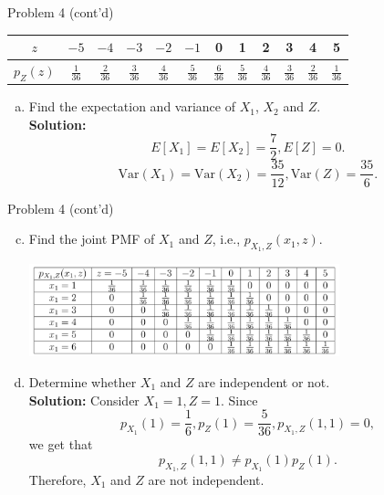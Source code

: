 \documentclass{beamer}
\begin{document}
\begin{frame}{Problem 4 (cont'd)}
\begin{center}
\begin{tabular}{|c|c|c|c|c|c|c|c|c|c|c|c|}
  \hline
  $z$ & $-5$ & $-4$ & $-3$ & $-2$ & $-1$ & 0 & 1 & 2 & 3 & 4 & 5 \\
  \hline
  $p_{Z}(z)$ & $\frac{1}{36}$ & $\frac{2}{36}$ & $\frac{3}{36}$ & $\frac{4}{36}$ & $\frac{5}{36}$
  & $\frac{6}{36}$ & $\frac{5}{36}$ & $\frac{4}{36}$ & $\frac{3}{36}$ & $\frac{2}{36}$ & $\frac{1}{36}$\\
  \hline
\end{tabular}
\end{center}
    \begin{enumerate}[(b)]
        \item Find the expectation and variance of $X_1$, $X_2$ and $Z$. \\
            {\bf Solution:}
            \[E[X_1]=E[X_2]=\frac{7}{2}, E[Z]=0.\]
            \[\text{Var}(X_1)=\text{Var}(X_2)= \frac{35}{12}, \text{Var}(Z)= \frac{35}{6}.\]
    \end{enumerate}
\end{frame}
\begin{frame}{Problem 4 (cont'd)}
    \begin{enumerate}[(a)]
    \setcounter{enumi}{2}
        \item Find the joint PMF of $X_1$ and $Z$, i.e., $p_{X_1,Z}(x_1,z)$. \\
        \begin{center}
            \includegraphics[width=9cm]{fig2}
        \end{center}
        \item Determine whether $X_1$ and $Z$ are independent or not. \\
        {\bf Solution:} Consider $X_1=1, Z=1$. Since \[p_{X_1}(1)=\frac{1}{6}, p_{Z}(1)=\frac{5}{36},
         p_{X_1,Z}(1,1)=0,\] we get that \[p_{X_1,Z}(1,1) \neq p_{X_1}(1)p_{Z}(1).\]
         Therefore, $X_1$ and $Z$ are not independent.
    \end{enumerate}
\end{frame}
\end{document}
